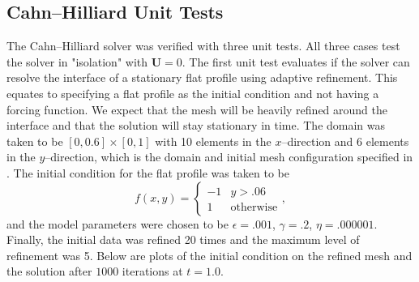 \documentclass[11pt,fullpage]{article}
\newcommand{\eps}{\epsilon}
\theoremstyle{lemma}
\theoremstyle{definition}
\theoremstyle{lemma}
\begin{document}
\subsection{Cahn--Hilliard Unit Tests}
The Cahn--Hilliard solver was verified with three unit tests. All three cases test the solver in "isolation" with $\mathbf{U} = 0$. The first unit test evaluates if the solver can resolve the interface of a stationary flat profile using adaptive refinement. This equates to specifying a flat profile as the initial condition and not having a forcing function. We expect that the mesh will be heavily refined around the interface and that the solution will stay stationary in time. The domain was taken to be $[0,0.6]\times [0,1]$ with 10 elements in the $x$--direction and 6 elements in the $y$--direction, which is the domain and initial mesh configuration specified in \cite{DiffuseInterface}. The initial condition for the flat profile was taken to be
$$
f(x, y) = \begin{cases}
-1 & y > .06\\
1 & \text{otherwise}
\end{cases},
$$
and the model parameters were chosen to be $\eps = .001$, $\gamma = .2$, $\eta = .000001$. Finally, the initial data was refined 20 times and the maximum level of refinement was 5. Below are plots of the initial condition on the refined mesh and the solution after $1000$ iterations at $t=1.0$.
\end{document}
